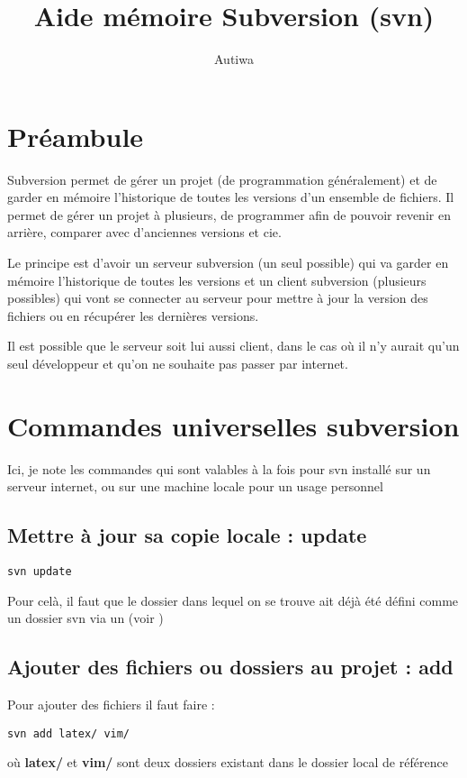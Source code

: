 \documentclass[a4paper,twoside]{article}
\title{Aide mémoire Subversion (svn)}
\author{Autiwa}
\begin{document}
\tableofcontents

\clearpage

\section{Préambule}
Subversion permet de gérer un projet (de programmation généralement) et de garder en mémoire l'historique de toutes les versions d'un ensemble de fichiers. Il permet de gérer un projet à plusieurs, de programmer afin de pouvoir revenir en arrière, comparer avec d'anciennes versions et cie. 

Le principe est d'avoir un serveur subversion (un seul possible) qui va garder en mémoire l'historique de toutes les versions et un client subversion (plusieurs possibles) qui vont se connecter au serveur pour mettre à jour la version des fichiers ou en récupérer les dernières versions.

\begin{remarque}
Il est possible que le serveur soit lui aussi client, dans le cas où il n'y aurait qu'un seul développeur et qu'on ne souhaite pas passer par internet.
\end{remarque}

\section{Commandes universelles subversion}
Ici, je note les commandes qui sont valables à la fois pour svn installé sur un serveur internet, ou sur une machine locale pour un usage personnel

\subsection{Mettre à jour sa copie locale : update} 
\begin{verbatim}
svn update
\end{verbatim}

Pour celà, il faut que le dossier dans lequel on se trouve ait déjà été défini comme un dossier svn via un  (voir )

\subsection{Ajouter des fichiers ou dossiers au projet : add} 
Pour ajouter des fichiers il faut faire :
\begin{verbatim}
svn add latex/ vim/ 
\end{verbatim}
où \textbf{latex/} et \textbf{vim/} sont deux dossiers existant dans le dossier local de référence
\end{document}
